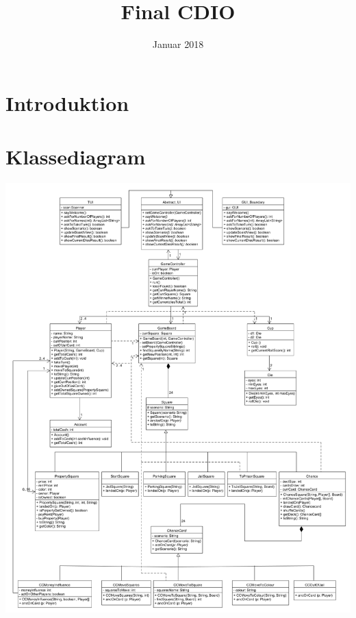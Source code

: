 \documentclass{article}
\title{Final CDIO}
\author{}
\date{Januar 2018}
\begin{document}
{\selectfont
\maketitle
\tableofcontents
\thispagestyle{empty}
\newpage
\clearpage
\setcounter{page}{1}

\section{Introduktion}


\section{Klassediagram}
\includegraphics[scale = 0.3]{diagrams_png/DKD.png}
}
\end{document}
